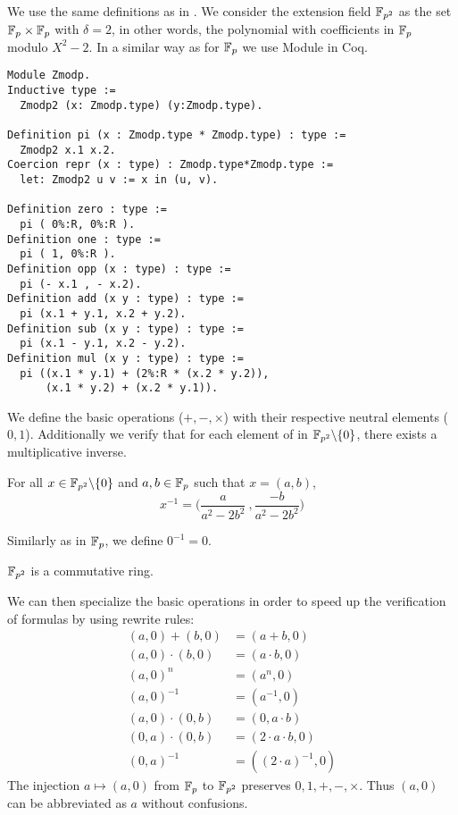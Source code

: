 We use the same definitions as in \cite{Ber06}. We consider the extension field $\mathbb{F}_{p^2}$ as the set $\mathbb{F}_{p} \times \mathbb{F}_{p}$ with $\delta = 2$, in other words,
the polynomial with coefficients in $\mathbb{F}_{p}$ modulo $X^2 - 2$. In a similar way as for $\mathbb{F}_{p}$ we use Module in Coq.
\begin{lstlisting}[language=Coq]
Module Zmodp.
Inductive type :=
  Zmodp2 (x: Zmodp.type) (y:Zmodp.type).

Definition pi (x : Zmodp.type * Zmodp.type) : type :=
  Zmodp2 x.1 x.2.
Coercion repr (x : type) : Zmodp.type*Zmodp.type :=
  let: Zmodp2 u v := x in (u, v).

Definition zero : type :=
  pi ( 0%:R, 0%:R ).
Definition one : type :=
  pi ( 1, 0%:R ).
Definition opp (x : type) : type :=
  pi (- x.1 , - x.2).
Definition add (x y : type) : type :=
  pi (x.1 + y.1, x.2 + y.2).
Definition sub (x y : type) : type :=
  pi (x.1 - y.1, x.2 - y.2).
Definition mul (x y : type) : type :=
  pi ((x.1 * y.1) + (2%:R * (x.2 * y.2)),
      (x.1 * y.2) + (x.2 * y.1)).
\end{lstlisting}
We define the basic operations ($+, -, \times$) with their respective neutral elements ($0, 1$).
Additionally we verify that for each element of in $\mathbb{F}_{p^2}\backslash\{0\}$, there exists a multiplicative inverse.
\begin{lemma} For all $x \in \mathbb{F}_{p^2}\backslash\{0\}$ and $a,b \in \mathbb{F}_{p}$ such that $x = (a,b)$,
$$x^{-1} = \Big(\frac{a}{a^2-2b^2}\ , \frac{-b}{a^2-2b^2}\Big)$$
\end{lemma}
Similarly as in $\mathbb{F}_{p}$, we define $0^{-1} = 0$.
\begin{lemma}
$\mathbb{F}_{p^2}$ is a commutative ring.
\end{lemma}
We can then specialize the basic operations in order to speed up the verification of formulas by using rewrite rules:
\begin{align*}
(a,0) + (b,0) &= (a+b, 0)\\
(a,0) \cdot   (b,0) &= (a \cdot b, 0)\\
(a, 0)^n &= (a^n, 0)\\
(a, 0)^{-1} &= (a^{-1}, 0)\\
(a, 0)\cdot (0,b) &= (0, a\cdot b)\\
(0, a)\cdot (0,b) &= (2\cdot a\cdot b, 0)\\
(0,a)^{-1} &= ((2\cdot a)^{-1},0)
\end{align*}
The injection $a \mapsto (a,0)$ from $\mathbb{F}_{p}$ to $\mathbb{F}_{p^2}$ preserves $0, 1, +, -, \times$. Thus $(a,0)$ can be abbreviated as $a$ without confusions.


